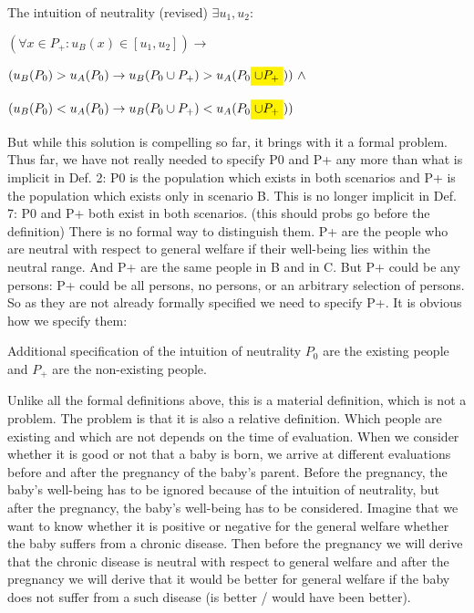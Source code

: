 \begin{Definition}{The intuition of neutrality (revised)}{} 
$
  \exists u_1, u_2: 
$

\hspace{.5cm} $
  (\forall x \in P_+ : u_B(x) \in [u_1, u_2] )
  \rightarrow 
$

\hspace{1cm} $
  ( u_B(P_0) > u_A(P_0) 
  \rightarrow 
  u_B(P_0 \cup P_+) > u_A(P_0 \highlight{ \cup P_+}) ) 
  \ \wedge
$

\hspace{1cm} $
  ( u_B(P_0) < u_A(P_0) 
  \rightarrow 
  u_B(P_0 \cup P_+) < u_A(P_0 \highlight{ \cup P_+})) 
$
\end{Definition}

But while this solution is compelling so far, it brings with it a formal problem. Thus far, we have not really needed to specify P0 and P+ any more than what is implicit in Def. 2: P0 is the population which exists in both scenarios and P+ is the population which exists only in scenario B. This is no longer implicit in Def. 7: P0 and P+ both exist in both scenarios. (this should probs go before the definition) There is no formal way to distinguish them. P+ are the people who are neutral with respect to general welfare if their well-being lies within the neutral range. And P+ are the same people in B and in C. But P+ could be any persons: P+ could be all persons, no persons, or an arbitrary selection of persons. So as they are not already formally specified we need to specify P+. It is obvious how we specify them:  

\begin{Definition}{Additional specification of the intuition of neutrality}{}
$P_0$ are the existing people and $P_+$ are the non-existing people.
\end{Definition}

Unlike all the formal definitions above, this is a material definition, which is not a problem. The problem is that it is also a relative definition. Which people are existing and which are not depends on the time of evaluation. When we consider whether it is good or not that a baby is born, we arrive at different evaluations before and after the pregnancy of the baby’s parent. Before the pregnancy, the baby’s well-being has to be ignored because of the intuition of neutrality, but after the pregnancy, the baby’s well-being has to be considered. Imagine that we want to know whether it is positive or negative for the general welfare whether the baby suffers from a chronic disease. Then before the pregnancy we will derive that the chronic disease is neutral with respect to general welfare and after the pregnancy we will derive that it would be better for general welfare if the baby does not suffer from a such disease (is better / would have been better).  

